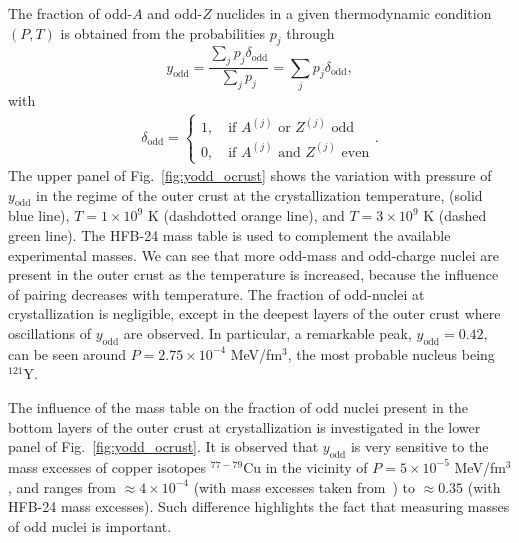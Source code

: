 The fraction of odd-$A$ and odd-$Z$ nuclides in a given thermodynamic condition 
$(P,T)$ is obtained from the probabilities $p_j$ through
%
\begin{equation}
  y_{\text{odd}} = \frac{\sum_{j} p_j \delta_{\text{odd}}}{\sum_j p_j} 
  = \sum_j p_j\delta_{\text{odd}},\label{eq:yodd}
\end{equation}
%
with
%
\begin{eqnarray}
  \delta_{\text{odd}} =\left\{
                \begin{array}{ll}
                  1, \quad \text{if $A^{(j)}$ or $Z^{(j)}$ odd}\\
                  0, \quad \text{if $A^{(j)}$ and $Z^{(j)}$ even}
                \end{array}
              \right..
\end{eqnarray}
%
The upper panel of Fig.~\ref{fig:yodd_ocrust} shows the variation with pressure 
of $y_{\text{odd}}$ in the regime of the outer crust at the crystallization
temperature, (solid blue line), $T=1\times 10^9$ K (dashdotted orange 
line), and $T=3\times 10^9$ K (dashed green line). The HFB-24 mass table is
used to complement the available experimental masses.
We can see that more odd-mass and odd-charge nuclei are present in the outer
crust as the temperature is increased, because the influence of pairing
decreases with temperature. 
The fraction of odd-nuclei at crystallization is negligible, except in the
deepest layers of the outer crust where oscillations of $y_{\text{odd}}$ are
observed.
In particular, a remarkable peak, $y_{\text{odd}} = 0.42$, can be seen around 
$P = 2.75\times 10^{-4}$ MeV/fm$^3$, the most probable nucleus being $^{121}$Y.

The influence of the mass table on the fraction of odd nuclei present in the 
bottom layers of the outer crust at crystallization is investigated in the 
lower panel of Fig.~\ref{fig:yodd_ocrust}.
It is observed that $y_{\text{odd}}$ is very sensitive to the mass excesses of 
copper isotopes $^{77-79}$Cu in the vicinity of $P = 5\times 10^{-5}$ 
MeV/fm$^3$, and ranges from $\approx 4\times 10^{-4}$ (with mass excesses taken 
from~\cite{Welker2017}) to $\approx 0.35$ (with HFB-24 mass excesses).
Such difference highlights the fact that measuring masses of odd nuclei is 
important.

